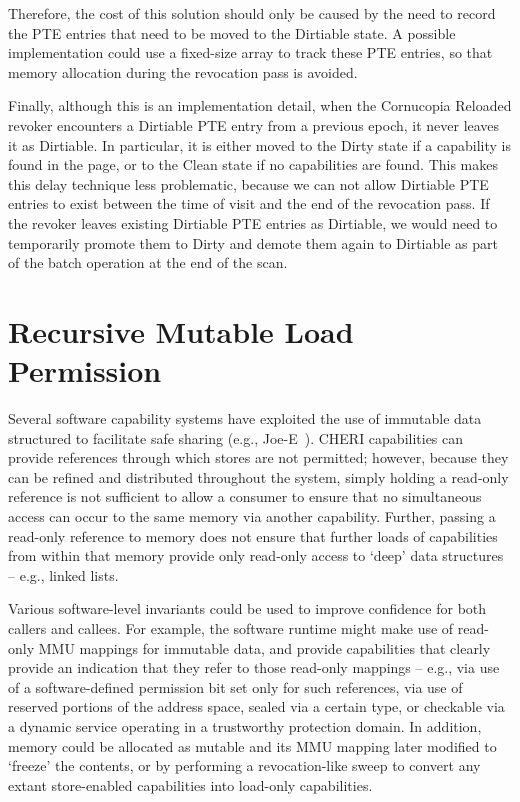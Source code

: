 Therefore, the cost of this solution should only be caused by the need to record
the PTE entries that need to be moved to the Dirtiable state.
A possible implementation could use a fixed-size array to track these PTE entries,
so that memory allocation during the revocation pass is avoided.

Finally, although this is an implementation detail, when the Cornucopia Reloaded
revoker encounters a Dirtiable PTE entry from a previous epoch, it never leaves
it as Dirtiable. In particular, it is either moved to the Dirty state if a
capability is found in the page, or to the Clean state if no
capabilities are found.
This makes this delay technique less problematic, because we can not allow
Dirtiable PTE entries to exist between the time of visit and the end of the
revocation pass.
If the revoker leaves existing Dirtiable PTE entries as Dirtiable, we
would need to temporarily promote them to Dirty and demote them again
to Dirtiable as part of the batch operation at the end of the scan.

\section{Recursive Mutable Load Permission} %
\label{app:exp:recmutload}


Several software capability systems have exploited the use of immutable data
structured to facilitate safe sharing (e.g., Joe-E~\cite{mettler:joee}).
CHERI capabilities can provide references through which stores are not
permitted; however, because they can be refined and distributed throughout the
system, simply holding a read-only reference is not sufficient to allow a
consumer to ensure that no simultaneous access can occur to the same memory
via another capability.
Further, passing a read-only reference to memory does not ensure that further
loads of capabilities from within that memory provide only read-only access to
`deep' data structures -- e.g., linked lists.

Various software-level invariants could be used to improve confidence for both
callers and callees.
For example, the software runtime might make use of read-only MMU mappings for
immutable data, and provide capabilities that clearly provide an indication
that they refer to those read-only mappings -- e.g., via use of a
software-defined permission bit set only for such references, via use of
reserved portions of the address space, sealed via a certain type, or
checkable via a dynamic service operating in a trustworthy protection domain.
In addition, memory could be allocated as mutable and its MMU mapping later
modified to `freeze' the contents, or by performing a revocation-like sweep
to convert any extant store-enabled capabilities into load-only capabilities.

